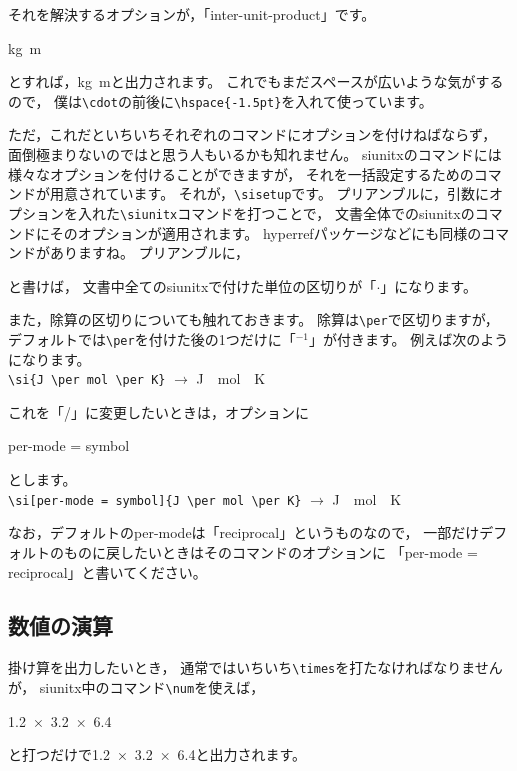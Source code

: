 それを解決するオプションが，「inter-unit-product」です。
\begin{ITeX}
\si[inter-unit-product = \ensuremath{\cdot}]{kg.m}
\end{ITeX}
とすれば，\si[inter-unit-product = \ensuremath{\cdot}]{kg.m}と出力されます。
これでもまだスペースが広いような気がするので，
僕は\verb|\cdot|の前後に\verb|\hspace{-1.5pt}|を入れて使っています。

ただ，これだといちいちそれぞれのコマンドにオプションを付けねばならず，
面倒極まりないのではと思う人もいるかも知れません。
siunitxのコマンドには様々なオプションを付けることができますが，
それを一括設定するためのコマンドが用意されています。
それが，\verb|\sisetup|です。
プリアンブルに，引数にオプションを入れた\verb|\siunitx|コマンドを打つことで，
文書全体でのsiunitxのコマンドにそのオプションが適用されます。
hyperrefパッケージなどにも同様のコマンドがありますね。
プリアンブルに，
\begin{ITeX}
\end{ITeX}
と書けば，
文書中全てのsiunitxで付けた単位の区切りが「$\cdot$」になります。

また，除算の区切りについても触れておきます。
除算は\verb|\per|で区切りますが，
デフォルトでは\verb|\per|を付けた後の1つだけに「${}^{-1}$」が付きます。
例えば次のようになります。\\
\hspace{5zw} \verb|\si{J \per mol \per K}|
$\rightarrow$ \si[per-mode = reciprocal]{J \per mol \per K}

これを「/」に変更したいときは，オプションに
\begin{ITeX}
per-mode = symbol
\end{ITeX}
とします。\\
\hspace{5zw} \verb|\si[per-mode = symbol]{J \per mol \per K}|
$\rightarrow$ \si[per-mode = symbol]{J \per mol \per K}

なお，デフォルトのper-modeは「reciprocal」というものなので，
一部だけデフォルトのものに戻したいときはそのコマンドのオプションに
「per-mode = reciprocal」と書いてください。


\subsection{数値の演算}

掛け算を出力したいとき，
通常ではいちいち\verb|\times|を打たなければなりませんが，
siunitx中のコマンド\verb|\num|を使えば，
\begin{ITeX}
\num{1.2 x 3.2 x 6.4}
\end{ITeX}
と打つだけで\num{1.2 x 3.2 x 6.4}と出力されます。

